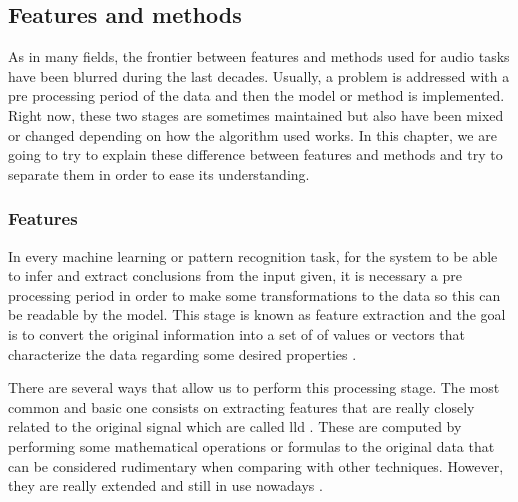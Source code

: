 
\subsection{Features and methods}
	
	As in many fields, the frontier between features and methods used for audio tasks have been blurred during the last decades. Usually, a problem is addressed with a pre processing period of the data and then the model or method is implemented. Right now, these two stages are sometimes maintained but also have been mixed or changed depending on how the algorithm used works. In this chapter, we are going to try to explain these difference between features and methods and try to separate them in order to ease its understanding.

\subsubsection{Features}

	In every machine learning or pattern recognition task, for the system to be able to infer and extract conclusions from the input given, it is necessary a pre processing period in order to make some transformations to the data so this can be readable by the model. This stage is known as feature extraction and the goal is to convert the original information into a set of of values or vectors that characterize the data regarding some desired properties \cite{Giannakopoulos2014}.
	
	There are several ways that allow us to perform this processing stage. The most common and basic one consists on extracting features that are really closely related to the original signal which are called \acrfull{lld}  \cite{Amatriain2004}. These are computed by performing some mathematical operations or formulas to the original data that can be considered rudimentary when comparing with other techniques. However, they are really extended and still in use nowadays \cite{Marr1982}. 
	
